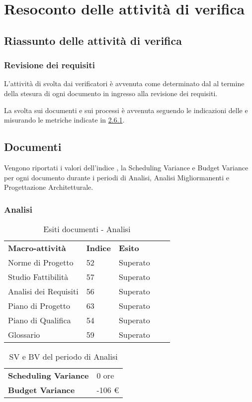 \newpage
\section{Resoconto delle attività di verifica} \label{App:AppendixA}
	\subsection{Riassunto delle attività di verifica} \label{App:AppendixA}
		\subsubsection{Revisione dei requisiti} \label{App:AppendixA}
			
			L'attività di  svolta dai verificatori è avvenuta come determinato dal \PianoDiProgetto al termine della stesura di ogni documento in ingresso alla revisione dei requisiti.
			
			La  svolta sui documenti e sui processi è avvenuta seguendo le indicazioni delle \NormeDiProgetto e misurando le metriche indicate in \hyperlink{metriche_documenti}{2.6.1}.
\subsection{Documenti} \label{App:AppendixB}
Vengono riportati i valori dell’indice , la Scheduling Variance e Budget Variance per ogni documento durante i periodi di Analisi, Analisi Migliormanenti e Progettazione Architetturale. 
\subsubsection{Analisi}
		\begin{table}[H]
			\centering
				\begin{tabular}{|l|l|l|ll}
					\cline{1-3}
					 \textbf{Macro-attività}  & \textbf{Indice \glossaryItem{Gulpease}}  & \textbf{Esito}  &  \\ \cline{1-3}
					 Norme di Progetto  & 52 & Superato &  \\ \cline{1-3}
					 Studio Fattibilità & 57 & Superato &  \\ \cline{1-3}
					 Analisi dei Requisiti & 56 & Superato &  \\ \cline{1-3}
					 Piano di Progetto & 63 & Superato &  \\ \cline{1-3}
					 Piano di Qualifica & 54 & Superato &  \\ \cline{1-3}
					 Glossario & 59 & Superato &  \\ \cline{1-3}
				\end{tabular}
				\caption{Esiti  documenti - Analisi}
		\end{table}
		\begin{table}[H]
		\centering
		\begin{tabular}{|l|l|}
		\cline{1-2}
		\textbf{Scheduling Variance} & 0 ore \\ \cline{1-2}
		\textbf{Budget Variance} & -106 \euro{} \\ \cline{1-2}
		\end{tabular}
		\caption{SV e BV del periodo di Analisi}
		\end{table}

